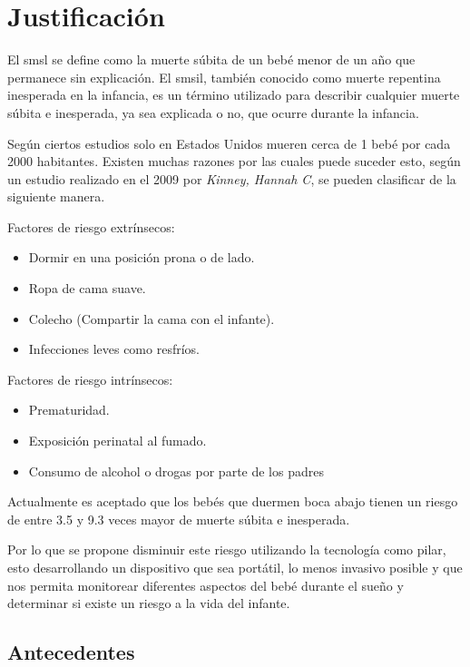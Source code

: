 
%
%
\section{Justificación}

El \acrfull{smsl} se define como la muerte súbita de un bebé menor de un año que permanece sin explicación. El \acrfull{smsil}, también conocido como muerte repentina inesperada en la infancia, es un término utilizado para describir cualquier muerte súbita e inesperada, ya sea explicada o no, que ocurre durante la infancia.

Según ciertos estudios\cite{b1} solo en Estados Unidos mueren cerca de 1 bebé por cada 2000 habitantes.
Existen muchas razones por las cuales puede suceder esto, según un estudio realizado en el 2009 por \emph{Kinney, Hannah C}\cite{b2}, se pueden clasificar de la siguiente manera.

Factores de riesgo extrínsecos:
\begin{itemize}
    \item Dormir en una posición prona o de lado.
    \item Ropa de cama suave.
    \item Colecho (Compartir la cama con el infante).
    \item Infecciones leves como resfríos.
\end{itemize}

Factores de riesgo intrínsecos:
\begin{itemize}
    \item Prematuridad.
    \item Exposición perinatal al fumado.
    \item Consumo de alcohol o drogas por parte de los padres
\end{itemize}

Actualmente es aceptado que los bebés que duermen boca abajo tienen un riesgo de entre 3.5 y 9.3 veces mayor de muerte súbita e inesperada.

Por lo que se propone disminuir este riesgo utilizando la tecnología como pilar, esto desarrollando un dispositivo que sea portátil, lo menos invasivo posible y que nos permita monitorear diferentes aspectos del bebé durante el sueño y determinar si existe un riesgo a la vida del infante.

\subsection{Antecedentes}

